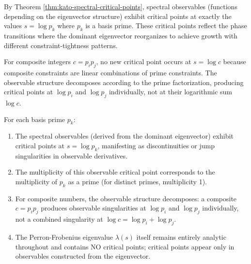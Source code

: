 By Theorem \ref{thm:kato-spectral-critical-points}, spectral observables (functions depending on the eigenvector structure) exhibit critical points at exactly the values $s = \log p_k$ where $p_k$ is a basis prime. These critical points reflect the phase transitions where the dominant eigenvector reorganizes to achieve growth with different constraint-tightness patterns.

For composite integers $c = p_i p_j$, no new critical point occurs at $s = \log c$ because composite constraints are linear combinations of prime constraints. The observable structure decomposes according to the prime factorization, producing critical points at $\log p_i$ and $\log p_j$ individually, not at their logarithmic sum $\log c$.

\begin{proposition}
\label{prop:cascade-singularities}
For each basis prime $p_k$:

\begin{enumerate}
\item The spectral observables (derived from the dominant eigenvector) exhibit critical points at $s = \log p_k$, manifesting as discontinuities or jump singularities in observable derivatives.
\item The multiplicity of this observable critical point corresponds to the multiplicity of $p_k$ as a prime (for distinct primes, multiplicity 1).
\item For composite numbers, the observable structure decomposes: a composite $c = p_i p_j$ produces observable singularities at $\log p_i$ and $\log p_j$ individually, not a combined singularity at $\log c = \log p_i + \log p_j$.
\item The Perron-Frobenius eigenvalue $\lambda(s)$ itself remains entirely analytic throughout and contains NO critical points; critical points appear only in observables constructed from the eigenvector.
\end{enumerate}

\end{proposition}

